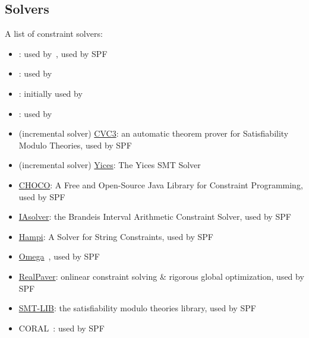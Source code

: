 \subsection{Solvers}
A list of constraint solvers:
\begin{itemize}
  \item \cite{STP-TR07}: used by~\cite{EXE-CCS06,KLEE-OSDI08,MineSweeper-BOTNET08}, used by SPF
  \item \cite{Z3-TACS08}: used by~\cite{FIRMALICE-NDSS15,MAYHEM-SP12,SAGE-QUEUE12}
  \item \cite{DISSOLVER-TR03}: initially used by \cite{SAGE-NDSS08}
  \item \cite{PPL-SCP08}: used by \cite{CFB-ACSAC06}
  \item (incremental solver) \href{http://www.cs.nyu.edu/acsys/cvc3/}{CVC3}: an automatic theorem prover for Satisfiability Modulo Theories, used by SPF
  \item (incremental solver) \href{http://yices.csl.sri.com/}{Yices}: The Yices SMT Solver~\cite{YICES-CAV06}
  \item \href{http://choco-solver.org/}{CHOCO}: A Free and Open-Source Java Library for Constraint Programming, used by SPF
  \item \href{http://www.cs.brandeis.edu/~tim/Applets/IAsolver.html}{IAsolver}: the Brandeis Interval Arithmetic Constraint Solver, used by SPF
  \item \href{https://people.csail.mit.edu/akiezun/hampi/}{Hampi}: A Solver for String Constraints, used by SPF
  \item \href{https://www.cs.umd.edu/projects/omega/}{Omega}~\cite{OMEGA-SC91}, used by SPF
  \item \href{http://pagesperso.lina.univ-nantes.fr/~granvilliers-l/realpaver/}{RealPaver}: onlinear constraint solving \& rigorous global optimization, used by SPF
  \item \href{http://smtlib.cs.uiowa.edu/}{SMT-LIB}: the satisfiability modulo theories library, used by SPF
  \item CORAL~\cite{CORAL-NFM11}: used by SPF
\end{itemize}
\fi

\iffalse
